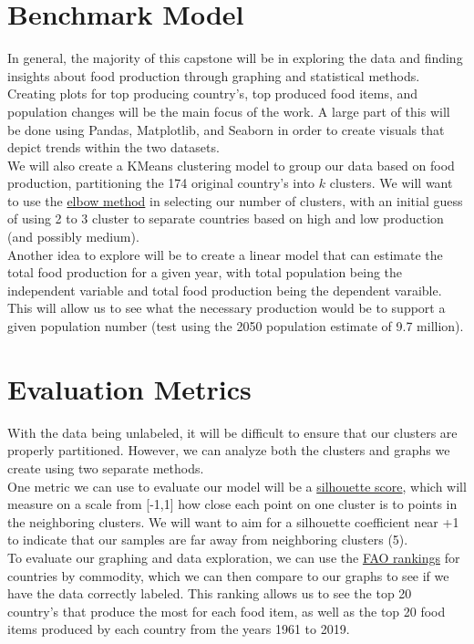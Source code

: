 \documentclass[12pt, a4paper]{article}
\begin{document}
\begin{spacing}{1.1}
	
	\section{Benchmark Model}
	In general, the majority of this capstone will be in exploring the data and finding insights about food production through graphing and statistical methods. Creating plots for top producing country's, top produced food items, and population changes will be the main focus of the work. A large part of this will be done using Pandas, Matplotlib, and Seaborn in order to create visuals that depict trends within the two datasets. \vspace*{2mm}\\	
	We will also create a KMeans clustering model to group our data based on food production, partitioning the 174 original country's into $k$ clusters. We will want to use the \href{https://www.scikit-yb.org/en/latest/api/cluster/elbow.html}{elbow method} in selecting our number of clusters, with an initial guess of using 2 to 3 cluster to separate countries based on high and low production (and possibly medium). \vspace*{2mm}\\
	Another idea to explore will be to create a linear model that can estimate the total food production for a given year, with total population being the independent variable and total food production being the dependent varaible. This will allow us to see what the necessary production would be to support a given population number (test using the 2050 population estimate of 9.7 million).\newpage

	
	\section{Evaluation Metrics}
	With the data being unlabeled, it will be difficult to ensure that our clusters are properly partitioned. However, we can analyze both the clusters and graphs we create using two separate methods. \vspace*{2mm}\\
	One metric we can use to evaluate our model will be a \href{https://scikit-learn.org/stable/auto_examples/cluster/plot_kmeans_silhouette_analysis.html}{silhouette score}, which will measure on a scale from [-1,1] how close each point on one cluster is to points in the neighboring clusters. We will want to aim for a silhouette coefficient near +1 to indicate that our samples are far away from neighboring clusters (5). \vspace*{2mm}\\
	To evaluate our graphing and data exploration, we can use the \href{http://www.fao.org/faostat/en/#rankings/countries_by_commodity}{FAO rankings} for countries by commodity, which we can then compare to our graphs to see if we have the data correctly labeled. This ranking allows us to see the top 20 country's that produce the most for each food item, as well as the top 20 food items produced by each country from the years 1961 to 2019.	
	

\end{spacing}
\end{document}
